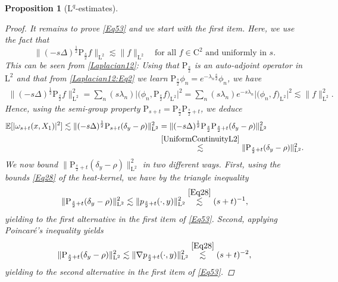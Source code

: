 \documentclass[11pt,a4paper,oneside]{amsart}
\numberwithin{equation}{section}
\newtheorem{proposition}[theorem]{Proposition}
\newcommand{\cc}{\text{C}}
\newcommand{\LL}{\mathrm{L}}
\newcommand{\pp}{\mathrm{P}}
\begin{document}
\begin{proposition}[$\LL^{q}$-estimates]
\begin{proof}
%
It remains to prove \eqref{Eq53} and we start with the first item. Here, we use the fact that  
%
\begin{equation}\label{UniformContinuityL2}
%
\|(-s\Delta)^{\frac{1}{2}}\text{P}_{\frac{s}{2}}f\|_{\LL^2}\lesssim \|f\|_{\LL^2}\quad\text{for all $f\in\cc^2$ and uniformly in $s$.}
%
\end{equation}
%
This can be seen from \eqref{Laplacian12}: Using that $\pp_{\frac{s}{2}}$ is an auto-adjoint operator in $\LL^2$ and that from \eqref{Laplacian12:Eq2} we learn $\pp_{\frac{s}{2}}\phi_n =e^{-\lambda_n \frac{s}{2}}\phi_n$, we have 
%
\begin{align*}
%
\|(-s\Delta)^{\frac{1}{2}}\text{P}_{\frac{s}{2}}f\|^2_{\LL^2}=\sum_n (s\lambda_n)\vert \big(\phi_n,\pp_{\frac{s}{2}} f\big)_{\LL^2}\vert^2=\sum_n(s\lambda_n)e^{-s\lambda_n }\vert \big(\phi_n,f\big)_{\LL^2}\vert^2\lesssim \|f\|^2_{\LL^2}.
%
\end{align*}
%
Hence, using the semi-group property $\text{P}_{s+t}=\text{P}_{\frac{s}{2}}\text{P}_{\frac{s}{2}+t}$, we deduce
%
\begin{align*}
\mathbb{E}[\vert\omega_{s+t}(x,X_1)\vert^2]\lesssim \|(-s\Delta)^{\frac{1}{2}}\text{P}_{s+t}(\delta_y-\rho)\|^2_{\LL^{2}}&=\|(-s\Delta)^{\frac{1}{2}}\text{P}_{\frac{s}{2}}\text{P}_{\frac{s}{2}+t}(\delta_y-\rho)\|^2_{\LL^{2}}\\
&\stackrel{\eqref{UniformContinuityL2}}{\lesssim} \|\text{P}_{\frac{s}{2}+t}(\delta_y-\rho)\|^2_{\LL^{2}}.
\end{align*}
%
We now bound $\|\text{P}_{\frac{s}{2}+t}(\delta_y-\rho)\|^2_{\LL^{2}}$ in two different ways. First, using the bounds \eqref{Eq28} of the heat-kernel, we have by the triangle inequality
%
$$\|\text{P}_{\frac{s}{2}+t}(\delta_y-\rho)\|^2_{\LL^{2}}\lesssim \|p_{\frac{s}{2}+t}(\cdot,y)\|^2_{\LL^{2}}\stackrel{\eqref{Eq28}}{\lesssim} (s+t)^{-1},$$
%
yielding to the first alternative in the first item of \eqref{Eq53}. Second, applying Poincaré's inequality yields
%
$$\|\text{P}_{\frac{s}{2}+t}(\delta_y-\rho)\|^2_{\LL^{2}}\lesssim \|\nabla p_{\frac{s}{2}+t}(\cdot,y)\|^2_{\LL^{2}}\stackrel{\eqref{Eq28}}{\lesssim} (s+t)^{-2},$$
%
yielding to the second alternative in the first item of \eqref{Eq53}.

%
\medskip
%


\end{proof}
\end{proposition}
\end{document}

